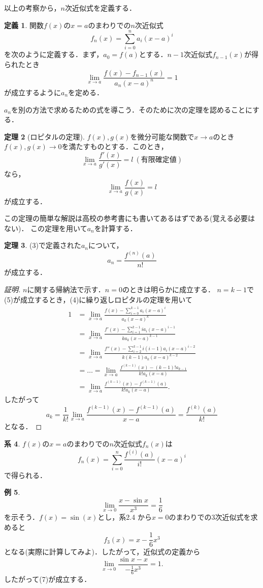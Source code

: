 \documentclass[uplatex]{jsarticle}
\theoremstyle{definition}
\newtheorem{theorem}{定理}[section]
\newtheorem{definition}[theorem]{定義}
\newtheorem{corollary}[theorem]{系}
\newtheorem{example}[theorem]{例}
\begin{document}
以上の考察から，$n$次近似式を定義する．
\begin{definition}
関数$f(x)$の$x=a$のまわりでの$n$次近似式
\begin{equation} f_n(x)=\sum_{i=0}^n a_i(x-a)^i \end{equation}
を次のように定義する．まず，$a_0=f(a)$とする．$n-1$次近似式$f_{n-1}(x)$が得られたとき
\begin{equation} \lim_{x\to a} \frac{f(x)-f_{n-1}(x)}{a_n(x-a)^n}=1 \end{equation}
が成立するように$a_n$を定める．
\end{definition}
$a_n$を別の方法で求めるための式を導こう．そのために次の定理を認めることにする．
\begin{theorem}[ロピタルの定理]
$f(x),g(x)$を微分可能な関数で$x\to a$のとき$f(x),g(x)\to 0$を満たすものとする．このとき，
\[ \lim_{x\to a} \frac{f'(x)}{g'(x)}=l \ (有限確定値) \]
なら，
\[ \lim_{x\to a} \frac{f(x)}{g(x)}=l \]
が成立する．
\end{theorem}
この定理の簡単な解説は高校の参考書にも書いてあるはずである(覚える必要はない)．
この定理を用いて$a_n$を計算する．
\begin{theorem}
(3)で定義された$a_n$について，
\begin{equation} a_n=\frac{f^{(n)}(a)}{n!} \end{equation}
が成立する．
\end{theorem}
\begin{proof}[証明]
$n$に関する帰納法で示す．$n=0$のときは明らかに成立する．
$n=k-1$で(5)が成立するとき，(4)に繰り返しロピタルの定理を用いて
\begin{align}
 1&=\lim_{x\to a} \frac{f(x)-\sum_{i=0}^{k-1}a_i(x-a)^i}{a_k(x-a)^k} \nonumber \\ 
&=\lim_{x\to a} \frac{f'(x)-\sum_{i=1}^{k-1}ia_i(x-a)^{i-1}}{ka_k(x-a)^{k-1}}  \nonumber \\
&=\lim_{x\to a} \frac{f''(x)-\sum_{i=2}^{k-1} i(i-1)a_i(x-a)^{i-2}}{k(k-1)a_k(x-a)^{k-2}} \nonumber \\
&=…=\lim_{x\to a} \frac{f^{(k-1)}(x)-(k-1)!a_{k-1}}{k!a_k(x-a)} \nonumber \\
&=\lim_{x\to a} \frac{f^{(k-1)}(x)-f^{(k-1)}(a)}{k!a_k(x-a)} \nonumber.
\end{align}
したがって
\[a_k=\frac{1}{k!}\lim_{x\to a} \frac{f^{(k-1)}(x)-f^{(k-1)}(a)}{x-a}=\frac{f^{(k)}(a)}{k!} \]
となる．
\end{proof}
\begin{corollary}
$f(x)$の$x=a$のまわりでの$n$次近似式$f_n(x)$は
\begin{equation}
f_n(x)=\sum_{i=0}^n \frac{f^{(i)}(a)}{i!}(x-a)^i
\end{equation}
で得られる．
\end{corollary}
\begin{example}
\begin{equation} \lim_{x\to 0} \frac{x-\sin x}{x^3}=\frac{1}{6} \end{equation}
を示そう．$f(x)=\sin(x)$とし，系2.4
から$x=0$のまわりでの3次近似式を求めると
\[ f_3(x)=x-\frac{1}{6}x^3 \]
となる(実際に計算してみよ)．したがって，近似式の定義から
\[ \lim_{x\to 0} \frac{\sin x-x}{-\frac{1}{6}x^3}=1. \]
したがって(7)が成立する．
\end{example}
\end{document}
